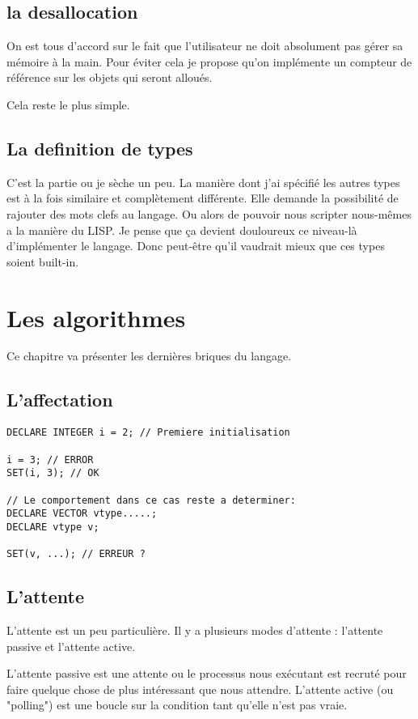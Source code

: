 \documentclass{rtxreport}
\begin{document}
\section{la desallocation}
On est tous d’accord sur le fait que l’utilisateur ne doit absolument pas gérer sa mémoire à la main. Pour éviter cela je propose qu’on implémente un compteur de référence sur les objets qui seront alloués.

Cela reste le plus simple.

\section{La definition de types}
C’est la partie ou je sèche un peu. La manière dont j’ai spécifié les autres types est à la fois similaire et complètement différente. Elle demande la possibilité de rajouter des mots clefs au langage. Ou alors de pouvoir nous scripter nous-mêmes a la manière du LISP. Je pense que ça devient douloureux ce niveau-là d’implémenter le langage. Donc peut-être qu’il vaudrait mieux que ces types soient built-in.

\chapter{Les algorithmes}

Ce chapitre va présenter les dernières briques du langage.

\section{L'affectation}
\begin{lstlisting}
DECLARE INTEGER i = 2; // Premiere initialisation

i = 3; // ERROR
SET(i, 3); // OK

// Le comportement dans ce cas reste a determiner:
DECLARE VECTOR vtype.....;
DECLARE vtype v;

SET(v, ...); // ERREUR ?
\end{lstlisting}

\section{L'attente}

L’attente est un peu particulière. Il y a plusieurs modes d’attente : l’attente passive et l’attente active.

L’attente passive est une attente ou le processus nous exécutant est recruté pour faire quelque chose de plus intéressant que nous attendre. L’attente active (ou "polling") est une boucle sur la condition tant qu’elle n’est pas vraie.
\end{document}
